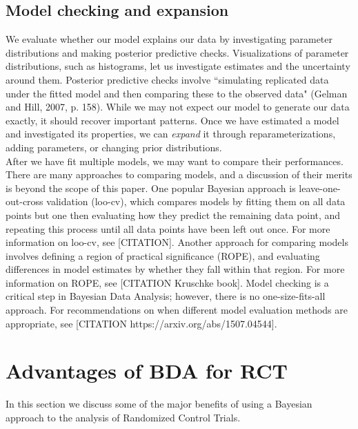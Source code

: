 \documentclass{article}
\begin{document}
\subsection{Model checking and expansion}
We evaluate whether our model explains our data by investigating parameter distributions and making posterior predictive checks.  Visualizations of parameter distributions, such as histograms, let us investigate estimates and the uncertainty around them.  Posterior predictive checks involve ``simulating replicated data under the fitted model and then comparing these to the observed data" (Gelman and Hill, 2007, p. 158).  While we may not expect our model to generate our data exactly, it should recover important patterns.  Once we have estimated a model and investigated its properties, we can \emph{expand} it through reparameterizations, adding parameters, or changing prior distributions.  \\
After we have fit multiple models, we may want to compare their performances.  There are many approaches to comparing models, and a discussion of their merits is beyond the scope of this paper.  One popular Bayesian approach is leave-one-out-cross validation (loo-cv), which compares models by fitting them on all data points but one then evaluating how they predict the remaining data point, and repeating this process until all data points have been left out once.  For more information on loo-cv, see [CITATION].  Another approach for comparing models involves defining a region of practical significance (ROPE), and evaluating differences in model estimates by whether they fall within that region.  For more information on ROPE, see [CITATION Kruschke book].  Model checking is a critical step in Bayesian Data Analysis; however, there is no one-size-fits-all approach.  For recommendations on when different model evaluation methods are appropriate, see [CITATION https://arxiv.org/abs/1507.04544].   

\section{Advantages of BDA for RCT}
In this section we discuss some of the major benefits of using a Bayesian approach to the analysis of Randomized Control Trials.
\end{document}
